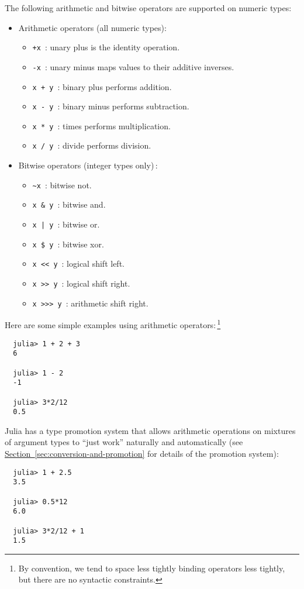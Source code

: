 \documentclass{article}
\newcommand{\Section}[1]{\hyperref[sec:#1]{Section~\ref*{sec:#1}}}
\begin{document}
The following arithmetic and bitwise operators are supported on numeric types:
\begin{itemize}
  \item Arithmetic operators (all numeric types):
  \begin{itemize}
    \item \verb|+x|~: unary plus is the identity operation.
    \item \verb|-x|~: unary minus maps values to their additive inverses.
    \item \verb|x + y|~: binary plus performs addition.
    \item \verb|x - y|~: binary minus performs subtraction.
    \item \verb|x * y|~: times performs multiplication.
    \item \verb|x / y|~: divide performs division.
  \end{itemize}
  \item Bitwise operators (integer types only)\,:
  \begin{itemize}
    \item \verb|~x|~: bitwise not.
    \item \verb|x & y|~: bitwise and.
    \item \texttt{x | y}~: bitwise or.
    \item \verb|x $ y|~: bitwise xor.
    \item \verb|x << y|~: logical shift left.
    \item \verb|x >> y|~: logical shift right.
    \item \verb|x >>> y|~: arithmetic shift right.
  \end{itemize}
\end{itemize}
Here are some simple examples using arithmetic operators:\,\footnote{By convention, we tend to space less tightly binding operators less tightly, but there are no syntactic constraints.}
\begin{verbatim}
  julia> 1 + 2 + 3
  6

  julia> 1 - 2
  -1

  julia> 3*2/12
  0.5
\end{verbatim}
Julia has a type promotion system that allows arithmetic operations on mixtures of argument types to ``just work'' naturally and automatically (see \Section{conversion-and-promotion} for details of the promotion system):
\begin{verbatim}
  julia> 1 + 2.5
  3.5

  julia> 0.5*12
  6.0

  julia> 3*2/12 + 1
  1.5
\end{verbatim}
\end{document}
